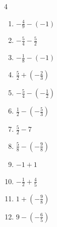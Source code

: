 \begin{multicols}{4}
\begin{enumerate}
  \item $\displaystyle -\frac{4}{9} - \left(-1\right)$


  \item $\displaystyle -\frac{5}{4} - \frac{5}{2}$


  \item $\displaystyle -\frac{1}{8} - \left(-1\right)$


\columnbreak %

  \item $\displaystyle \frac{5}{2} + \left(-\frac{2}{3}\right)$


  \item $\displaystyle -\frac{5}{4} - \left(-\frac{1}{2}\right)$


  \item $\displaystyle \frac{1}{2} - \left(-\frac{5}{3}\right)$


  \item $\displaystyle \frac{5}{2} - 7$


  \item $\displaystyle \frac{5}{8} - \left(-\frac{9}{8}\right)$


  \item $\displaystyle -1 + 1$

        \phantom{$\displaystyle =0$}

  \item $\displaystyle -\frac{1}{2} + \frac{4}{5}$


  \item $\displaystyle 1 + \left(-\frac{9}{8}\right)$


  \item $\displaystyle 9 - \left(-\frac{6}{5}\right)$


\end{enumerate}
\end{multicols}
